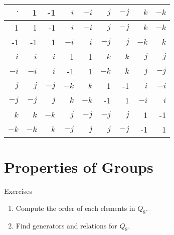 \begin{tabular}{r | r r r r r r r r}
$\cdot$ & 1 & -1 & $i$ & $-i$ & $j$ & $-j$ & $k$ & $-k$ \\
\hline
1 & 1 & -1 & $i$ & $-i$ & $j$ & $-j$ & $k$ & $-k$ \\
-1 & -1 & 1 & $-i$ & $i$ & $-j$ & $j$ & $-k$ & $k$ \\
$i$ & $i$ & $-i$ & 1 & -1 & $k$ & $-k$ & $-j$ & $j$ \\
$-i$ & $-i$ & $i$ & -1 & 1 & $-k$ & $k$ & $j$ & $-j$ \\
$j$ & $j$ & $-j$ & $-k$ & $k$ & 1 & -1 & $i$ & $-i$ \\
$-j$ & $-j$ & $j$ & $k$ & $-k$ & -1 & 1 & $-i$ & $i$ \\
$k$ & $k$ & $-k$ & $j$ & $-j$ & $-j$ & $j$ & 1 & -1 \\
$-k$ & $-k$ & $k$ & $-j$ & $j$ & $j$ & $-j$ & -1 & 1 
\end{tabular}


\section{Properties of Groups}

\begin{xcb}{Exercises}
        \begin{enumerate}
                \item
                Compute the order of each elements in $Q_8$.
                \item
                Find generators and relations for $Q_8$. 
        \end{enumerate}

\end{xcb}


